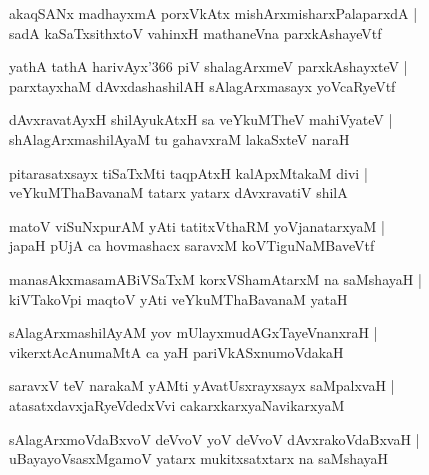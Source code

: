 \documentclass[twoside,12pt,openright]{book}
\newcounter{shloka}[chapter]
\begin{document}
\begin{shloka}%
akaqSANx madhayxmA porxVkAtx mishArxmisharxPalaparxdA |\\
sadA kaSaTxsithxtoV vahinxH mathaneVna parxkAshayeVtf
\end{shloka}

\begin{shloka}%
yathA tathA harivAyx\char'366 piV shalagArxmeV parxkAshayxteV |\\
parxtayxhaM dAvxdashashilAH sAlagArxmasayx yoVcaRyeVtf
\end{shloka}

\begin{shloka}%
dAvxravatAyxH shilAyukAtxH sa veYkuMTheV mahiVyateV |\\
shAlagArxmashilAyaM tu gahavxraM lakaSxteV naraH
\end{shloka}

\begin{shloka}%
pitarasatxsayx tiSaTxMti taqpAtxH kalApxMtakaM divi |\\
veYkuMThaBavanaM tatarx yatarx dAvxravatiV shilA
\end{shloka}

\begin{shloka}%
matoV viSuNxpurAM yAti tatitxVthaRM yoVjanatarxyaM |\\
japaH pUjA ca hovmashacx saravxM koVTiguNaMBaveVtf
\end{shloka}

\begin{shloka}%
manasAkxmasamABiVSaTxM korxVShamAtarxM na saMshayaH |\\
kiVTakoVpi maqtoV yAti veYkuMThaBavanaM yataH 
\end{shloka}

\begin{shloka}%
sAlagArxmashilAyAM yov mUlayxmudAGxTayeVnanxraH |\\
vikerxtAcAnumaMtA ca yaH pariVkASxnumoVdakaH
\end{shloka}

\begin{shloka}%
saravxV teV narakaM yAMti yAvatUsxrayxsayx saMpalxvaH |\\
atasatxdavxjaRyeVdedxVvi cakarxkarxyaNavikarxyaM 
\end{shloka}

\begin{shloka}%
sAlagArxmoVdaBxvoV deVvoV yoV deVvoV dAvxrakoVdaBxvaH |\\
uBayayoVsasxMgamoV yatarx mukitxsatxtarx na saMshayaH 
\end{shloka}
\end{document}
